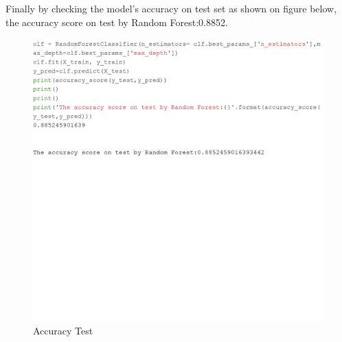 \documentclass[sigconf]{acmart}
\begin{document}
Finally by checking the model's accuracy on test set as shown on figure below, the accuracy score on test by Random Forest:0.8852.
\begin{figure}
    \centering
    \includegraphics[width=1.0\columnwidth]{project/images/Untitled7.png}
    \caption{Accuracy Test}
    \label{Accuracy}
\end{figure}
\end{document}
